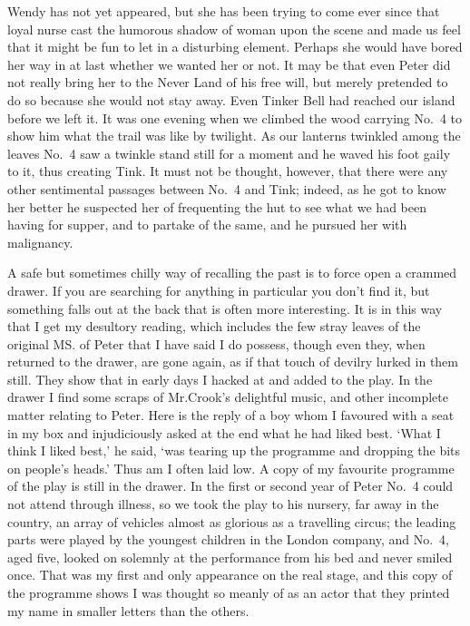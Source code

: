 Wendy has not yet appeared,
but she has been trying to come
ever since that loyal nurse cast the humorous shadow of woman upon the scene
and made us feel that it might be fun to let in a disturbing element.
Perhaps she would have bored her way in at last whether we wanted her or not.
It may be that even Peter did not really bring her to the Never Land of his free will,
but merely pretended to do so because she would not stay away.
Even Tinker Bell had reached our island before we left it.
It was one evening when we climbed the wood carrying No.~4
to show him what the trail was like by twilight.
As our lanterns twinkled among the leaves
No.~4 saw a twinkle stand still for a moment and he waved his foot gaily to it,
thus creating Tink.
It must not be thought, however,
that there were any other sentimental passages between No.~4 and Tink;
indeed, as he got to know her better
he suspected her of frequenting the hut to see what we had been having for supper,
and to partake of the same,
and he pursued her with malignancy.

A safe but sometimes chilly way of recalling the past is to force open a crammed drawer.
If you are searching for anything in particular you don’t find it,
but something falls out at the back that is often more interesting.
It is in this way that I get my desultory reading,
which includes the few stray leaves of the original MS. of Peter that I have said I do possess,
though even they, when returned to the drawer, are gone again,
as if that touch of devilry lurked in them still.
They show that in early days I hacked at and added to the play.
In the drawer I find some scraps of Mr.\@ Crook’s delightful music,
and other incomplete matter relating to Peter.
Here is the reply of a boy whom I favoured with a seat in my box
and injudiciously asked at the end what he had liked best.
‘What I think I liked best,’ he said,
‘was tearing up the programme and dropping the bits on people’s heads.’
Thus am I often laid low.
A copy of my favourite programme of the play is still in the drawer.
In the first or second year of Peter No.~4 could not attend through illness,
so we took the play to his nursery, far away in the country,
an array of vehicles almost as glorious as a travelling circus;
the leading parts were played by the youngest children in the London company,
and No.~4, aged five, looked on solemnly at the performance from his bed and never smiled once.
That was my first and only appearance on the real stage,
and this copy of the programme shows I was thought so meanly of as an actor
that they printed my name in smaller letters than the others.

